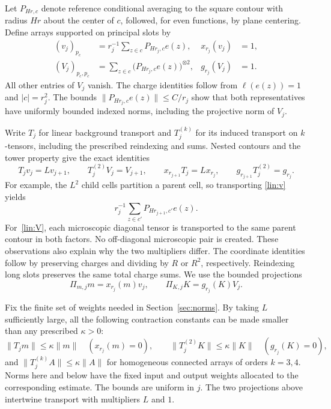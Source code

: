 Let $P_{Hr,c}$ denote reference conditional averaging to the square contour
with radius $Hr$ about the center of $c$, followed, for even functions, by
plane centering.  Define arrays supported on principal slots by
\begin{align}
 (v_j)_{p_c}&=r_j^{-1}\sum_{z\in c}P_{Hr_j,c}e(z),
       &x_{r_j}(v_j)&=1,\label{lin:v}\\
 (V_j)_{p_c,p_c}&=\sum_{z\in c}
                       \bigl(P_{Hr_j,c}e(z)\bigr)^{\otimes2},
       &g_{r_j}(V_j)&=1.\label{lin:V}
\end{align}
All other entries of $V_j$ vanish.  The charge identities follow from
$\ell(e(z))=1$ and $|c|=r_j^2$.  The bounds
$\|P_{Hr_j,c}e(z)\|\le C/r_j$ show that both representatives have uniformly
bounded indexed norms, including the projective norm of $V_j$.

Write $T_j$ for linear background transport and $T_j^{(k)}$ for its induced
transport on $k$-tensors, including the prescribed reindexing and sums.
Nested contours and the tower property give the exact identities
\begin{equation}\label{lin:exact}
 T_jv_j=Lv_{j+1},\qquad T_j^{(2)}V_j=V_{j+1},\qquad
 x_{r_{j+1}}T_j=Lx_{r_j},\qquad
 g_{r_{j+1}}T_j^{(2)}=g_{r_j}.
\end{equation}
For example, the $L^2$ child cells partition a parent cell, so transporting
\eqref{lin:v} yields
\[
 r_j^{-1}\sum_{z\in c'}P_{Hr_{j+1},c'}e(z).
\]
For~\eqref{lin:V}, each microscopic diagonal tensor is transported to the
same parent contour in both factors.  No off-diagonal microscopic pair is
created.  These observations also explain why the two multipliers differ.
The coordinate identities follow by preserving charges and dividing by
$R$ or $R^2$, respectively.  Reindexing long slots preserves the same total
charge sums.  We use the bounded projections
\[
 \Pi_{m,j}m=x_{r_j}(m)v_j,\qquad
 \Pi_{K,j}K=g_{r_j}(K)V_j.
\]

\begin{proposition}\label{lin:background}
Fix the finite set of weights needed in Section~\ref{sec:norms}.  By taking
$L$ sufficiently large, all the following contraction constants can be made
smaller than any prescribed $\kappa>0$:
\[
 \|T_jm\|\le\kappa\|m\|\quad(x_{r_j}(m)=0),\qquad
 \|T_j^{(2)}K\|\le\kappa\|K\|\quad(g_{r_j}(K)=0),
\]
and $\|T_j^{(k)}A\|\le\kappa\|A\|$ for homogeneous connected arrays of
orders $k=3,4$.  Norms here and below have the fixed input and output weights
allocated to the corresponding estimate.  The bounds are uniform in $j$.
The two projections above intertwine transport with multipliers $L$ and $1$.
\end{proposition}

